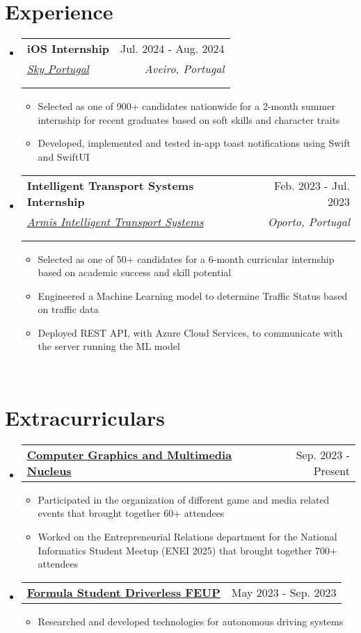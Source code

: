 \documentclass[a4paper,11pt]{article}
\makeatletter
\newcommand{\resumeItem}[1]{
  \item\small{
    {#1 \vspace{-2pt}}
  }
}
\newcommand{\resumeSubheading}[5]{
  \vspace{-2pt}\item
    \begin{tabular*}{0.97\textwidth}[t]{l@{\extracolsep{\fill}}r}
      \textbf{#1} & #2 \\
      \textit{\small#3} & \textit{\small #4} \\
      \if\relax\detokenize{#5}\relax
      \else
        \multicolumn{2}{@{}l}{\textit{\small#5}} \\
      \fi
    \end{tabular*}\vspace{-7pt}
}
\newcommand{\resumeSubSubheading}[2]{
    \item
    \begin{tabular*}{0.97\textwidth}{l@{\extracolsep{\fill}}r}
      \textit{\small#1} & \textit{\small #2} \\
    \end{tabular*}\vspace{-7pt}
}
\newcommand{\resumeProjectHeading}[2]{
    \item
    \begin{tabular*}{0.97\textwidth}{l@{\extracolsep{\fill}}r}
      \small#1 & #2 \\
    \end{tabular*}\vspace{-7pt}
}
\newcommand{\resumeSubHeadingListStart}{\begin{itemize}[leftmargin=0.15in, label={}]}
\newcommand{\resumeSubHeadingListEnd}{\end{itemize}}
\newcommand{\resumeItemListStart}{\begin{itemize}}
\newcommand{\resumeItemListEnd}{\end{itemize}\vspace{-5pt}}
\makeatother
\begin{document}

\section{Experience}
  \resumeSubHeadingListStart

    \resumeSubheading
        {iOS Internship}{Jul. 2024 - Aug. 2024}
        {\href{https://www.sky.com/}{Sky Portugal}}{Aveiro, Portugal}
        {}
        \resumeItemListStart
            \resumeItem{Selected as one of 900+ candidates nationwide for a 2-month summer internship for recent graduates based on soft skills and character traits}
            \resumeItem{Developed, implemented and tested in-app toast notifications using Swift and SwiftUI}
        \resumeItemListEnd

    \resumeSubheading
      {Intelligent Transport Systems Internship}{Feb. 2023 - Jul. 2023}
      {\href{https://www.armisgroup.com/intelligent-transport-systems/}{Armis Intelligent Transport Systems}}{Oporto, Portugal}
      {}
      \resumeItemListStart
        \resumeItem{Selected as one of 50+ candidates for a 6-month curricular internship based on academic success and skill potential}
        \resumeItem{Engineered a Machine Learning model to determine Traffic Status based on traffic data}
        \resumeItem{Deployed REST API, with Azure Cloud Services, to communicate with the server running the ML model}
      \resumeItemListEnd
  \resumeSubHeadingListEnd
\leavevmode \\ %

\section{Extracurriculars}
    \resumeSubHeadingListStart
      \resumeProjectHeading
                {\textbf{\href{https://ncgm.fe.up.pt/}{Computer Graphics and Multimedia Nucleus}}}{Sep. 2023 - Present}
          \resumeItemListStart
            \resumeItem{Participated in the organization of different game and media related events that brought together 60+ attendees}
			\resumeItem{Worked on the Entrepreneurial Relations department for the National Informatics Student Meetup (ENEI 2025) that brought together 700+ attendees}
          \resumeItemListEnd
      \resumeProjectHeading
          {\textbf{\href{https://formulastudent.fe.up.pt/en/}{Formula Student Driverless FEUP}}}{May 2023 - Sep. 2023}
          \resumeItemListStart
            \resumeItem{Researched and developed technologies for autonomous driving systems}
          \resumeItemListEnd
    \resumeSubHeadingListEnd
\leavevmode \\ %
\end{document}
